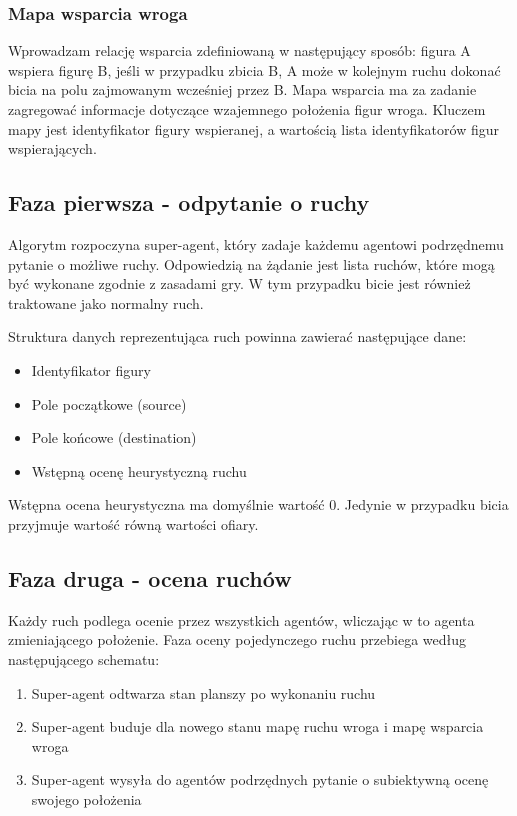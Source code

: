 \documentclass[a4paper,12pt,oneside,notitlepage,onecolumn]{article}
\begin{document}
\subsubsection{Mapa wsparcia wroga}
Wprowadzam relację wsparcia zdefiniowaną w następujący sposób: figura A wspiera figurę B, jeśli w przypadku zbicia B, A może w kolejnym ruchu dokonać bicia na polu zajmowanym wcześniej przez B.
Mapa wsparcia ma za zadanie zagregować informacje dotyczące wzajemnego położenia figur wroga.
Kluczem mapy jest identyfikator figury wspieranej, a wartością lista identyfikatorów figur wspierających.

\subsection{Faza pierwsza - odpytanie o ruchy}
Algorytm rozpoczyna super-agent, który zadaje każdemu agentowi podrzędnemu pytanie o możliwe ruchy.
Odpowiedzią na żądanie jest lista ruchów, które mogą być wykonane zgodnie z zasadami gry.
W tym przypadku bicie jest również traktowane jako normalny ruch.

Struktura danych reprezentująca ruch powinna zawierać następujące dane:
\begin{itemize}
 \item Identyfikator figury
 \item Pole początkowe (source)
 \item Pole końcowe (destination)
 \item Wstępną ocenę heurystyczną ruchu
\end{itemize}

Wstępna ocena heurystyczna ma domyślnie wartość 0.
Jedynie w przypadku bicia przyjmuje wartość równą wartości ofiary.

\subsection{Faza druga - ocena ruchów}
Każdy ruch podlega ocenie przez wszystkich agentów, wliczając w to agenta zmieniającego położenie.
Faza oceny pojedynczego ruchu przebiega według następującego schematu:
\begin{enumerate}
 \item Super-agent odtwarza stan planszy po wykonaniu ruchu
 \item Super-agent buduje dla nowego stanu mapę ruchu wroga i mapę wsparcia wroga
 \item Super-agent wysyła do agentów podrzędnych pytanie o subiektywną ocenę swojego położenia
\end{enumerate}
\end{document}
